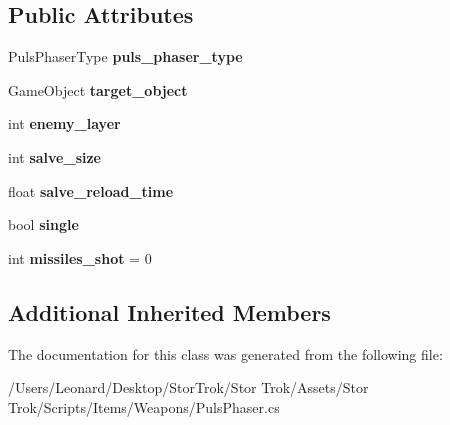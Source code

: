 \subsection*{Public Attributes}
\begin{DoxyCompactItemize}
\item 
\mbox{\label{class_puls_phaser_a4de6f49e6f25e894804d4445b009b476}} 
Puls\+Phaser\+Type {\bfseries puls\+\_\+phaser\+\_\+type}
\item 
\mbox{\label{class_puls_phaser_a103a91e5a6c4b08b2bcc9c2e26aaba85}} 
Game\+Object {\bfseries target\+\_\+object}
\item 
\mbox{\label{class_puls_phaser_ab90dff5bc0e667619ee8c060b9fce547}} 
int {\bfseries enemy\+\_\+layer}
\item 
\mbox{\label{class_puls_phaser_ac54bdede3eaeb9e388a87270d277bb47}} 
int {\bfseries salve\+\_\+size}
\item 
\mbox{\label{class_puls_phaser_aa82b6f0ca30e589c0ef54a51244b944e}} 
float {\bfseries salve\+\_\+reload\+\_\+time}
\item 
\mbox{\label{class_puls_phaser_aab30bccc3e64d9ba26f75b20e59f7c05}} 
bool {\bfseries single}
\item 
\mbox{\label{class_puls_phaser_aec1223f2f87386a2c2cab63cdddc9cee}} 
int {\bfseries missiles\+\_\+shot} = 0
\end{DoxyCompactItemize}
\subsection*{Additional Inherited Members}


The documentation for this class was generated from the following file\+:\begin{DoxyCompactItemize}
\item 
/\+Users/\+Leonard/\+Desktop/\+Stor\+Trok/\+Stor Trok/\+Assets/\+Stor Trok/\+Scripts/\+Items/\+Weapons/Puls\+Phaser.\+cs\end{DoxyCompactItemize}
